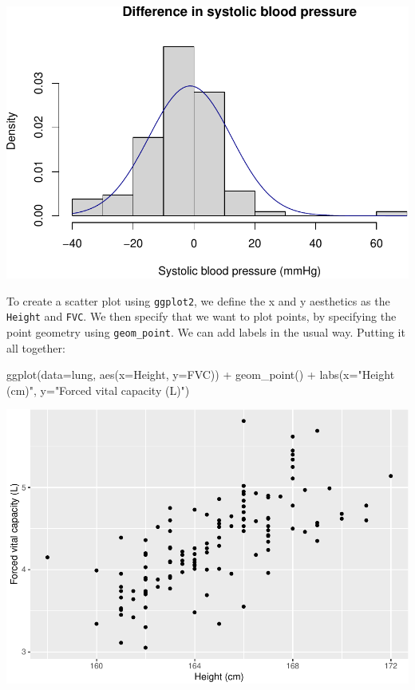 \documentclass[
]{memoir}
\newenvironment{Shaded}{\begin{snugshade}}{\end{snugshade}}
\newcommand{\AttributeTok}[1]{\textcolor[rgb]{0.77,0.63,0.00}{#1}}
\newcommand{\FunctionTok}[1]{\textcolor[rgb]{0.00,0.00,0.00}{#1}}
\newcommand{\NormalTok}[1]{#1}
\newcommand{\SpecialCharTok}[1]{\textcolor[rgb]{0.00,0.00,0.00}{#1}}
\newcommand{\StringTok}[1]{\textcolor[rgb]{0.31,0.60,0.02}{#1}}
\begin{document}
\includegraphics{phcm9795-R-notes_files/figure-latex/unnamed-chunk-94-1.pdf}

To create a scatter plot using \texttt{ggplot2}, we define the x and y aesthetics as the \texttt{Height} and \texttt{FVC}. We then specify that we want to plot points, by specifying the point geometry using \texttt{geom\_point}. We can add labels in the usual way. Putting it all together:

\begin{Shaded}
\begin{Highlighting}[]
\FunctionTok{ggplot}\NormalTok{(}\AttributeTok{data=}\NormalTok{lung, }\FunctionTok{aes}\NormalTok{(}\AttributeTok{x=}\NormalTok{Height, }\AttributeTok{y=}\NormalTok{FVC)) }\SpecialCharTok{+} 
  \FunctionTok{geom\_point}\NormalTok{() }\SpecialCharTok{+}
  \FunctionTok{labs}\NormalTok{(}\AttributeTok{x=}\StringTok{"Height (cm)"}\NormalTok{, }\AttributeTok{y=}\StringTok{"Forced vital capacity (L)"}\NormalTok{)}
\end{Highlighting}
\end{Shaded}

\includegraphics{phcm9795-R-notes_files/figure-latex/unnamed-chunk-95-1.pdf}
\end{document}
